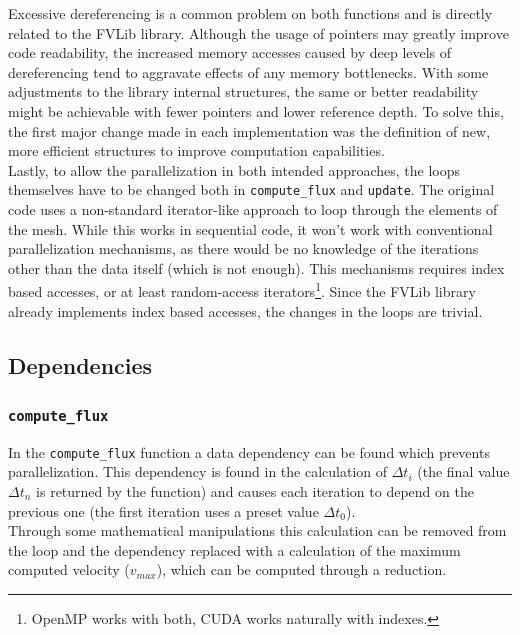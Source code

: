 \documentclass[9pt,twocolumn]{scrartcl}
\begin{document}
Excessive dereferencing is a common problem on both functions and is directly related to the FVLib library. Although the usage of pointers may greatly improve code readability, the increased memory accesses caused by deep levels of dereferencing tend to aggravate effects of any memory bottlenecks. With some adjustments to the library internal structures, the same or better readability might be achievable with fewer pointers and lower reference depth. To solve this, the first major change made in each implementation was the definition of new, more efficient structures to improve computation capabilities.\\

Lastly, to allow the parallelization in both intended approaches, the loops themselves have to be changed both in \texttt{compute\_flux} and \texttt{update}. The original code uses a non-standard iterator-like approach to loop through the elements of the mesh. While this works in sequential code, it won't work with conventional parallelization mechanisms, as there would be no knowledge of the iterations other than the data itself (which is not enough). This mechanisms requires index based accesses, or at least random-access iterators\footnote{OpenMP works with both, CUDA works naturally with indexes.}. Since the FVLib library already implements index based accesses, the changes in the loops are trivial.\\

\subsection{Dependencies}
\label{subsec:dependencies}
\subsubsection{\texttt{compute\_flux}}
In the \texttt{compute\_flux} function a data dependency can be found which prevents parallelization. This dependency is found in the calculation of $\Delta t_{i}$ (the final value $\Delta t_{n}$ is returned by the function) and causes each iteration to depend on the previous one (the first iteration uses a preset value $\Delta t_{0}$).\\

Through some mathematical manipulations this calculation can be removed from the loop and the dependency replaced with a calculation of the maximum computed velocity ($v_{max}$), which can be computed through a reduction.\\
\end{document}
